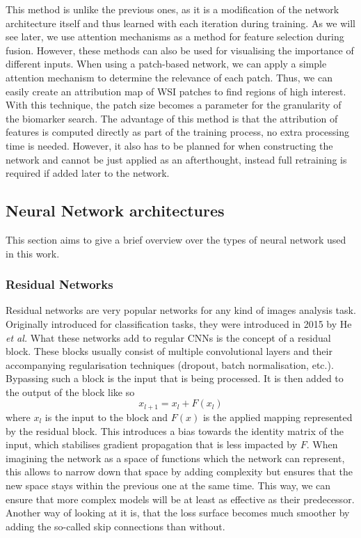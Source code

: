 This method is unlike the previous ones, as it is a modification of the network architecture itself and thus learned with each iteration during training.
As we will see later, we use attention mechanisms as a method for feature selection during fusion. However, these methods can also be used for visualising the importance of different inputs. When using a patch-based network, we can apply a simple attention mechanism to determine the relevance of each patch. Thus, we can easily create an attribution map of WSI patches to find regions of high interest. With this technique, the patch size becomes a parameter for the granularity of the biomarker search. \cite{Ilse2018Attention} The advantage of this method is that the attribution of features is computed directly as part of the training process, no extra processing time is needed. However, it also has to be planned for when constructing the network and cannot be just applied as an afterthought, instead full retraining is required if added later to the network. 


\subsection{Neural Network architectures}

This section aims to give a brief overview over the types of neural network used in this work. 

\subsubsection{Residual Networks}

Residual networks are very popular networks for any kind of images analysis task. Originally introduced for classification tasks, they were introduced in 2015 by He \textit{et al.} \cite{He2015Deep} What these networks add to regular CNNs is the concept of a residual block. These blocks usually consist of multiple convolutional layers and their accompanying regularisation techniques (dropout, batch normalisation, etc.). Bypassing such a block is the input that is being processed. It is then added to the output of the block like so \[x_{l+1} = x_l + F(x_l)\] where \(x_l\) is the input to the block and \(F(x)\) is the applied mapping represented by the residual block. This introduces a bias towards the identity matrix of the input, which stabilises gradient propagation that is less impacted by \(F\). \cite{He2015Deep} 
When imagining the network as a space of functions which the network can represent, this allows to narrow down that space by adding complexity but ensures that the new space stays within the previous one at the same time. This way, we can ensure that more complex models will be at least as effective as their predecessor. \cite{Zhang2021Dive}
Another way of looking at it is, that the loss surface becomes much smoother by adding the so-called skip connections than without. \cite{Li2017Visualizing}

